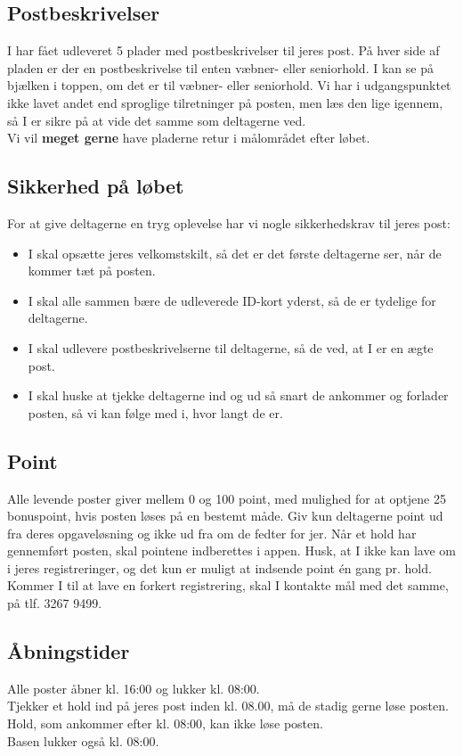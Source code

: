 \subsection{Postbeskrivelser}
I har fået udleveret 5 plader med postbeskrivelser til jeres post. På hver side af pladen er der en postbeskrivelse til enten væbner- eller seniorhold. I kan se på bjælken i toppen, om det er til væbner- eller seniorhold. Vi har i udgangspunktet ikke lavet andet end sproglige tilretninger på posten, men læs den lige igennem, så I er sikre på at vide det samme som deltagerne ved.\\
Vi vil \textbf{meget gerne} have pladerne retur i målområdet efter løbet.
\subsection{Sikkerhed på løbet}
For at give deltagerne en tryg oplevelse har vi nogle sikkerhedskrav til jeres post:
\begin{itemize}
  \item I skal opsætte jeres velkomstskilt, så det er det første deltagerne ser, når de kommer tæt på posten.
  \item I skal alle sammen bære de udleverede ID-kort yderst, så de er tydelige for deltagerne.
  \item I skal udlevere postbeskrivelserne til deltagerne, så de ved, at I er en ægte post.
  \item I skal huske at tjekke deltagerne ind og ud så snart de ankommer og forlader posten, så vi kan følge med i, hvor langt de er.
\end{itemize}
\subsection{Point}
Alle levende poster giver mellem 0 og 100 point, med mulighed for at optjene 25 bonuspoint, hvis posten løses på en bestemt måde. Giv kun deltagerne point ud fra deres opgaveløsning og ikke ud fra om de fedter for jer. Når et hold har gennemført posten, skal pointene indberettes i appen. Husk, at I ikke kan lave om i jeres registreringer, og det kun er muligt at indsende point én gang pr. hold.\\
\newline
Kommer I til at lave en forkert registrering, skal I kontakte mål med det samme, på tlf. 3267 9499.
\subsection{Åbningstider}
Alle poster åbner kl. 16:00 og lukker kl. 08:00.\\
Tjekker et hold ind på jeres post inden kl. 08.00, må de stadig gerne løse posten.\\
Hold, som ankommer efter kl. 08:00, kan ikke løse posten.\\
Basen lukker også kl. 08:00.
